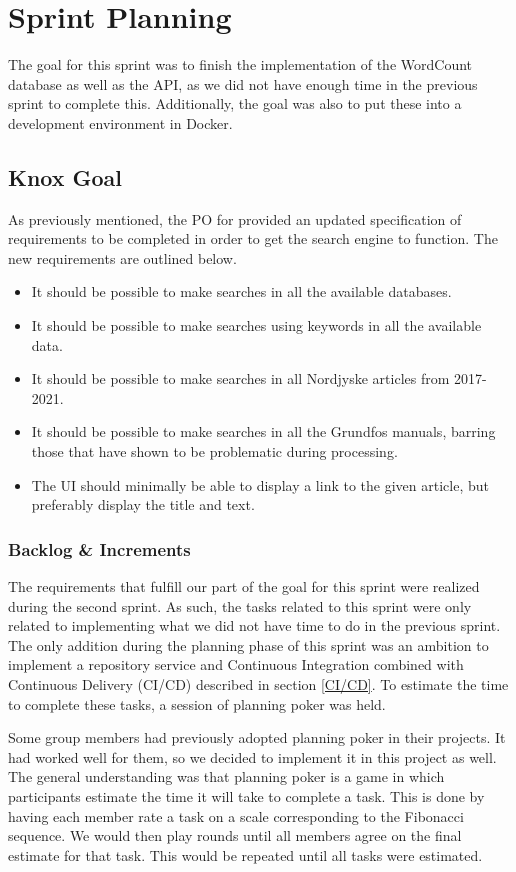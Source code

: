 \section{Sprint Planning}\label{sec:sprintPlanningSprint3}
The goal for this sprint was to finish the implementation of the WordCount database as well as the API, as we did not have enough time in the previous sprint to complete this. Additionally, the goal was also to put these into a development environment in Docker.

\subsection{Knox Goal}\label{ssec:sprint3Goal}
As previously mentioned, the PO for \knox{} provided an updated specification of requirements to be completed in order to get the search engine to function. The new requirements are outlined below. 
\begin{itemize}
	\item It should be possible to make searches in all the available databases.
	\item It should be possible to make searches using keywords in all the available data.
	\item It should be possible to make searches in all Nordjyske articles from 2017-2021.
	\item It should be possible to make searches in all the Grundfos manuals, barring those that have shown to be problematic during processing.
	\item The UI should minimally be able to display a link to the given article, but preferably display the title and text.
\end{itemize}


\subsubsection{Backlog \& Increments}
The requirements that fulfill our part of the \knox{} goal for this sprint were realized during the second sprint. As such, the tasks related to this sprint were only related to implementing what we did not have time to do in the previous sprint. 
The only addition during the planning phase of this sprint was an ambition to implement a repository service and Continuous Integration combined with Continuous Delivery (CI/CD) described in section \ref{CI/CD}.
To estimate the time to complete these tasks, a session of planning poker was held. 

Some group members had previously adopted planning poker in their projects. It had worked well for them, so we decided to implement it in this project as well. The general understanding was that planning poker is a game in which participants estimate the time it will take to complete a task. This is done by having each member rate a task on a scale corresponding to the Fibonacci sequence. We would then play rounds until all members agree on the final estimate for that task. This would be repeated until all tasks were estimated.

